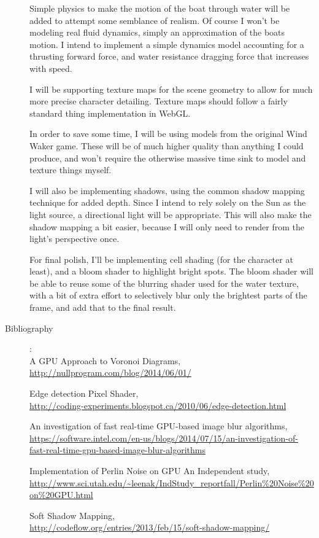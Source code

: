 \documentclass {article}
\begin{document}
\begin{description}
Simple physics to make the motion of the boat through water will be added to attempt some semblance of realism.  Of course I won't be modeling real fluid dynamics, simply an approximation of the boats motion.  I intend to implement a simple dynamics model accounting for a thrusting forward force, and water resistance dragging force that increases with speed. 

I will be supporting texture maps for the scene geometry to allow for much more precise character detailing.  Texture maps should follow a fairly standard thing implementation in WebGL.

In order to save some time, I will be using models from the original Wind Waker game.  These will be of much higher quality than anything I could produce, and won't require the otherwise massive time sink to model and texture things myself.

I will also be implementing shadows, using the common shadow mapping technique for added depth.  Since I intend to rely solely on the Sun as the light source, a directional light will be appropriate.  This will also make the shadow mapping a bit easier, because I will only need to render from the light's perspective once.

For final polish, I'll be implementing cell shading (for the character at least), and a bloom shader to highlight bright spots.  The bloom shader will be able to reuse some of the blurring shader used for the water texture, with a bit of extra effort to selectively blur only the brightest parts of the frame, and add that to the final result.

\item[Bibliography]:\\

A GPU Approach to Voronoi Diagrams,\\
\url{http://nullprogram.com/blog/2014/06/01/}

Edge detection Pixel Shader,\\
\url{http://coding-experiments.blogspot.ca/2010/06/edge-detection.html}

An investigation of fast real-time GPU-based image blur algorithms,\\
\url{https://software.intel.com/en-us/blogs/2014/07/15/an-investigation-of-fast-real-time-gpu-based-image-blur-algorithms}

Implementation of Perlin Noise on GPU An Independent study,\\
\url{http://www.sci.utah.edu/~leenak/IndStudy_reportfall/Perlin%20Noise%20on%20GPU.html}

Soft Shadow Mapping,\\
\url{http://codeflow.org/entries/2013/feb/15/soft-shadow-mapping/}

\end{description}
\newpage
\end{document}
